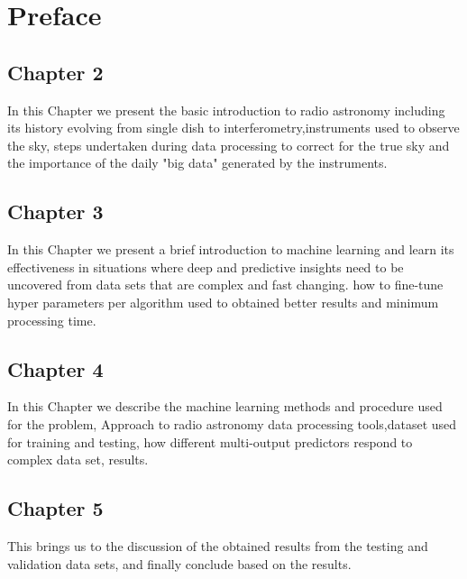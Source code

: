 \chapter*{Preface}

\section*{Chapter 2}
In this Chapter we present the basic introduction to radio astronomy including its history evolving from single dish to interferometry,instruments used to observe the sky, steps undertaken during data processing to correct for the true sky and the importance of the daily "big data" generated by the instruments.    
\section*{Chapter 3}
In this Chapter we present a brief introduction to machine learning and learn its effectiveness in situations where deep and predictive insights need to be uncovered from data sets that are complex and fast changing. how to fine-tune hyper parameters per algorithm used to obtained better results and minimum processing time.  
\section*{Chapter 4}
In this Chapter we describe the machine learning methods and procedure used for the problem, Approach to radio astronomy data processing tools,dataset used for training and testing, how different multi-output predictors respond to complex data set, results.
\section*{Chapter 5}
This brings us to the discussion of the obtained results from the testing and validation data sets, and finally conclude based on the results. 
